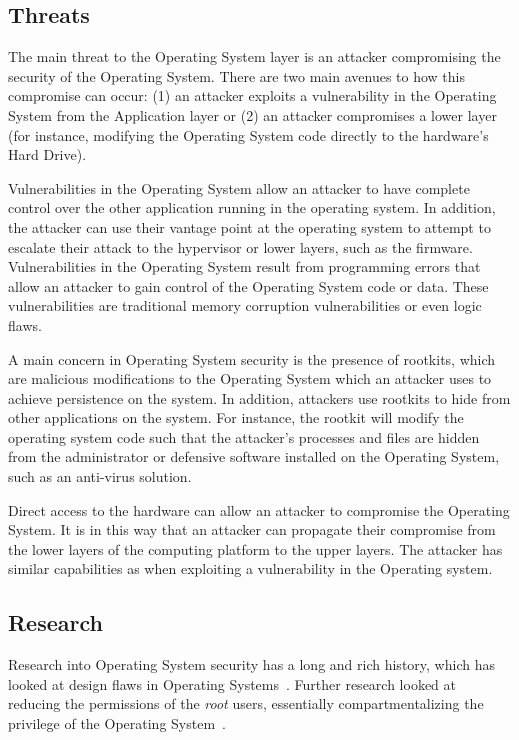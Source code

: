 \documentclass[11pt,letterpaper]{article}
\begin{document}
\subsection{Threats}

The main threat to the Operating System layer is an attacker
compromising the security of the Operating System. There are two main
avenues to how this compromise can occur: (1) an attacker exploits a
vulnerability in the Operating System from the Application layer or
(2) an attacker compromises a lower layer (for instance, modifying the
Operating System code directly to the hardware's Hard Drive).

Vulnerabilities in the Operating System allow an attacker to have
complete control over the other application running in the operating
system. In addition, the attacker can use their vantage point at the
operating system to attempt to escalate their attack to the hypervisor
or lower layers, such as the firmware. Vulnerabilities in the
Operating System result from programming errors that allow an attacker
to gain control of the Operating System code or data. These
vulnerabilities are traditional memory corruption vulnerabilities or
even logic flaws. 

A main concern in Operating System security is the presence of
rootkits, which are malicious modifications to the Operating System
which an attacker uses to achieve persistence on the system. In
addition, attackers use rootkits to hide from other applications on
the system. For instance, the rootkit will modify the operating system
code such that the attacker's processes and files are hidden from the
administrator or defensive software installed on the Operating System,
such as an anti-virus solution. 

Direct access to the hardware can allow an attacker to compromise the
Operating System. It is in this way that an attacker can propagate
their compromise from the lower layers of the computing platform to
the upper layers. The attacker has similar capabilities as when
exploiting a vulnerability in the Operating system.

\subsection{Research}

Research into Operating System security has a long and rich history,
which has looked at design flaws in Operating
Systems~\cite{attanasio1973}. Further research looked at reducing the
permissions of the \emph{root} users, essentially compartmentalizing
the privilege of the Operating System~\cite{kamp2000, kurmus2014a}.
\end{document}
